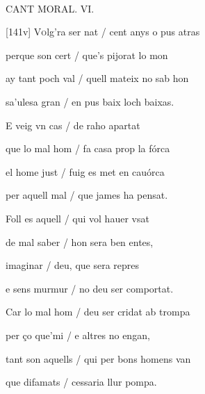 \documentclass[12pt]{article}
\renewcommand{\espaiAbansEtiquetaPoema}{\vspace{0ex}}
\begin{document}
\begin{estrofa}

\espaiAbansEtiquetaPoema

\\

\begin{rubrica}

CANT MORAL. VI. 

\end{rubrica}

\end{estrofa}


\begin{estrofa}

 [141v] V\textsc{o}lg'ra ser nat / cent anys o pus atras

 perque son cert / que's pijorat lo mon

 ay tant poch val / quell mateix no sab hon

 sa'ulesa gran / en pus baix loch baixas.

 E veig vn cas / de raho apartat

 que lo mal hom / fa casa prop la f\'{o}rca

 el home just / fuig es met en cau\'{o}rca

 per aquell mal / que james ha pensat.

\end{estrofa}



\begin{estrofa}

 Foll es aquell / qui vol hauer vsat

 de mal saber / hon sera ben entes,

 imaginar / deu, que sera repres

 e sens murmur / no deu ser comportat.

 Car lo mal hom / deu ser cridat ab trompa

 per \c{c}o que'mi / e altres no engan,

 tant son aquells / qui per bons homens van

 que difamats / cessaria llur pompa.

\end{estrofa}
\end{document}
